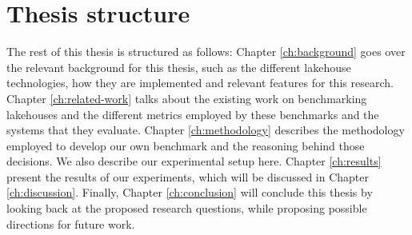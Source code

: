 

\section{Thesis structure}
The rest of this thesis is structured as follows: Chapter \ref{ch:background} goes over the relevant background for this thesis, such as the different lakehouse technologies, how they are implemented and relevant features for this research. Chapter \ref{ch:related-work} talks about the existing work on benchmarking lakehouses and the different metrics employed by these benchmarks and the systems that they evaluate. Chapter \ref{ch:methodology} describes the methodology employed to develop our own benchmark and the reasoning behind those decisions. We also describe our experimental setup here. Chapter \ref{ch:results} present the results of our experiments, which will be discussed in Chapter \ref{ch:discussion}. Finally, Chapter \ref{ch:conclusion} will conclude this thesis by looking back at the proposed research questions, while proposing possible directions for future work.
